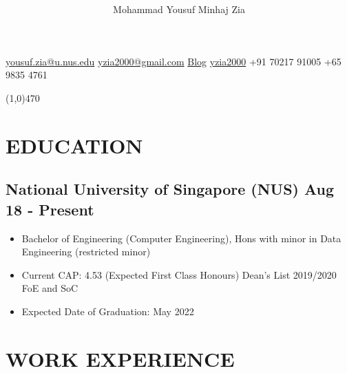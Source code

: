 \documentclass[9pts]{article}
\date{\vspace{-5ex}}
\title{\vspace{-5ex} \vspace{-5ex}}
\author{\Huge Mohammad Yousuf Minhaj Zia}
\begin{document}
\maketitle

\centerline{
\href{mailto:yousuf.zia@u.nus.edu}{yousuf.zia@u.nus.edu} \textbar \hspace{1pt}
\href{mailto:yzia2000@gmail.com}{yzia2000@gmail.com} \textbar \hspace{1pt} 
\href{https://yzia2000.github.io/blog}{Blog} \textbar \hspace{1pt} 
\href{https://github.com/yzia2000}{\faGithub \hspace{1pt} yzia2000} \textbar \hspace{1pt}
\href{https://www.linkedin.com/in/mohammad-yousuf-minhaj-zia-ab555396}{\faLinkedin} \textbar \hspace{1pt}
+91 70217 91005 \textbar \hspace{1pt} 
+65 9835 4761 
}

\line(1,0){470}\\

\section*{EDUCATION}
\subsection*{National University of Singapore (NUS) \hfill Aug 18 - Present}
\begin{itemize}
    \item Bachelor of Engineering (Computer Engineering), Hons with minor in Data Engineering (restricted minor)
    \item Current CAP: 4.53 (Expected First Class Honours) Dean's List 2019/2020 FoE and SoC
    \item Expected Date of Graduation: May 2022
\end{itemize}

\section*{WORK EXPERIENCE}
\end{document}
